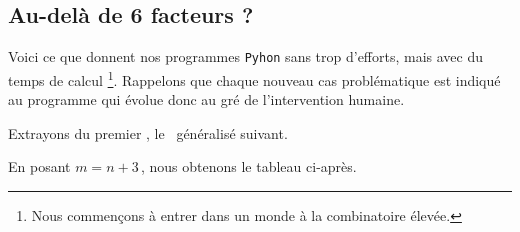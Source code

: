 \subsection{Au-delà de 6 facteurs ?}

\leavevmode
\smallskip

Voici ce que donnent nos programmes \verb#Pyhon# sans trop d'efforts, mais avec du temps de calcul 
\footnote{
	Nous commençons à entrer dans un monde à la combinatoire élevée.
}.
Rappelons que chaque nouveau cas problématique est indiqué au programme qui évolue donc au gré de l'intervention humaine.








%
\begin{center}
\end{center}

Extrayons du premier \sftab[], le \sftab\ généralisé suivant.
%
\begin{center}
\end{center}

En posant $m = n + 3$\,, nous obtenons le tableau ci-après.
%
\begin{center}
\end{center}


